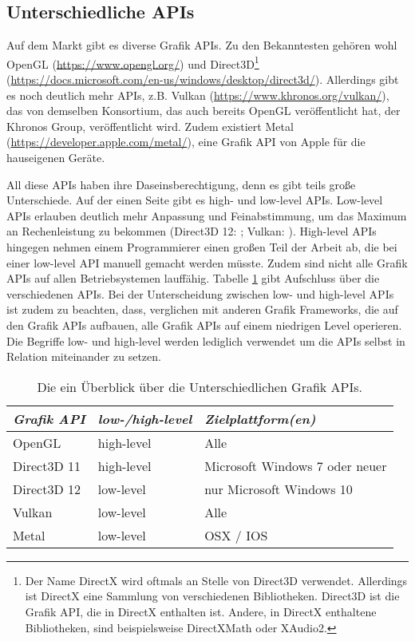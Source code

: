 \subsection{Unterschiedliche APIs}
Auf dem Markt gibt es diverse Grafik APIs. Zu den Bekanntesten gehören wohl OpenGL (\url{https://www.opengl.org/}) und Direct3D\footnote{Der Name DirectX wird oftmals an Stelle von Direct3D verwendet. Allerdings ist DirectX eine Sammlung von verschiedenen Bibliotheken. Direct3D ist die Grafik API, die in DirectX enthalten ist. Andere, in DirectX enthaltene Bibliotheken, sind beispielsweise DirectXMath oder XAudio2.} (\url{https://docs.microsoft.com/en-us/windows/desktop/direct3d/}). Allerdings gibt es noch deutlich mehr APIs, z.B. Vulkan (\url{https://www.khronos.org/vulkan/}), das von demselben Konsortium, das auch bereits OpenGL veröffentlicht hat, der Khronos Group, veröffentlicht wird. Zudem existiert Metal (\url{https://developer.apple.com/metal/}), eine Grafik API von Apple für die hauseigenen Geräte.

All diese APIs haben ihre Daseinsberechtigung, denn es gibt teils große Unterschiede. Auf der einen Seite gibt es high- und low-level APIs. Low-level APIs erlauben deutlich mehr Anpassung und Feinabstimmung, um das Maximum an Rechenleistung zu bekommen (Direct3D 12: \cite{d3d12_what_is_d3d12}; Vulkan: \cite{vk_getting_started_win}). High-level APIs hingegen nehmen einem Programmierer einen großen Teil der Arbeit ab, die bei einer low-level API manuell gemacht werden müsste. Zudem sind nicht alle Grafik APIs auf allen Betriebsystemen lauffähig. Tabelle \ref{tab:apis} gibt Aufschluss über die verschiedenen APIs. Bei der Unterscheidung zwischen low- und high-level APIs ist zudem zu beachten, dass, verglichen mit anderen Grafik Frameworks, die auf den Grafik APIs aufbauen, alle Grafik APIs auf einem niedrigen Level operieren. Die Begriffe low- und high-level werden lediglich verwendet um die APIs selbst in Relation miteinander zu setzen.

\begin{table}[tb]
	\centering
    \caption{Die ein Überblick über die Unterschiedlichen Grafik APIs.}
    \label{tab:apis}
    \begin{tabular}{lll}
        \toprule
        \emph{Grafik API} & \emph{low-/high-level} & \emph{Zielplattform(en)} \\ 
        \midrule
        OpenGL      & high-level & Alle\cite{opengl_wiki_faq} \\
        Direct3D 11 & high-level & Microsoft Windows 7 oder neuer\cite{d3d_manual_startpage} \\
        Direct3D 12 & low-level  & nur Microsoft Windows 10\cite{d3d12_what_is_d3d12} \\
        Vulkan      & low-level  & Alle\footnotemark\cite{vk_getting_started_win}\cite{vk_getting_started_linux}\cite{vk_getting_started_mac} \\
        Metal       & low-level  & OSX / IOS\cite{metal_front_page} \\ 
        \bottomrule
	\end{tabular}
\end{table}

